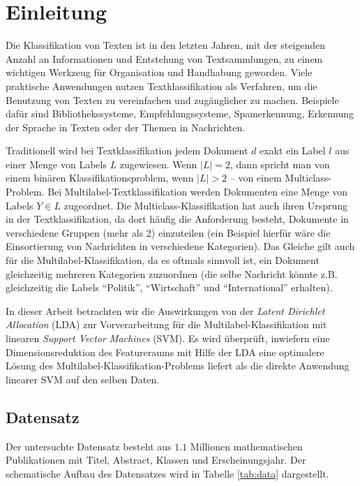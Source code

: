 \section{Einleitung}
Die Klassifikation von Texten ist in den letzten Jahren, mit der steigenden Anzahl an Informationen und Entstehung von Textsammlungen, zu einem wichtigen Werkzeug für Organisation und Handhabung geworden.
Viele praktische Anwendungen nutzen Textklassifikation als Verfahren, um die Benutzung von Texten zu vereinfachen und zugänglicher zu machen.
Beispiele dafür sind Bibliothekssysteme, Empfehlungssysteme, Spamerkennung, Erkennung der Sprache in Texten oder der Themen in Nachrichten.

Traditionell wird bei Textklassifikation jedem Dokument $d$ exakt ein Label $l$ aus einer Menge von Labels $L$ zugewiesen.
Wenn $|L| = 2$, dann spricht man von einem binären Klassifikationsproblem, wenn $|L| > 2$ -- von einem Multiclass-Problem.
Bei Multilabel-Textklassifikation werden Dokumenten eine Menge von Labels $Y \in L$ zugeordnet.
Die Multiclass-Klassifikation hat auch ihren Ursprung in der Textklassifikation, da dort häufig die Anforderung besteht, Dokumente in verschiedene Gruppen (mehr als 2) einzuteilen (ein Beispiel hierfür wäre die Einsortierung von Nachrichten in verschiedene Kategorien).
Das Gleiche gilt auch für die Multilabel-Klassifikation, da es oftmals sinnvoll ist, ein Dokument gleichzeitig mehreren Kategorien zuzuordnen (die selbe Nachricht könnte z.B. gleichzeitig die Labels ``Politik'', ``Wirtschaft'' und ``International'' erhalten).

In dieser Arbeit betrachten wir die Auswirkungen von der \emph{Latent Dirichlet Allocation} (LDA) zur Vorverarbeitung für die Multilabel-Klassifikation mit linearen \emph{Support Vector Machines} (SVM).
Es wird überprüft, inwiefern eine Dimensionsreduktion des Featureraums mit Hilfe der LDA eine optimalere Lösung des Multilabel-Klassifikation-Problems liefert als die direkte Anwendung linearer SVM auf den selben Daten.

\subsection{Datensatz}
\label{sub:datensatz}
Der untersuchte Datensatz besteht aus $1.1$ Millionen mathematischen Publikationen mit Titel, Abstract, Klassen und Erscheinungsjahr.
Der schematische Aufbau des Datensatzes wird in Tabelle \ref{tab:data} dargestellt.

